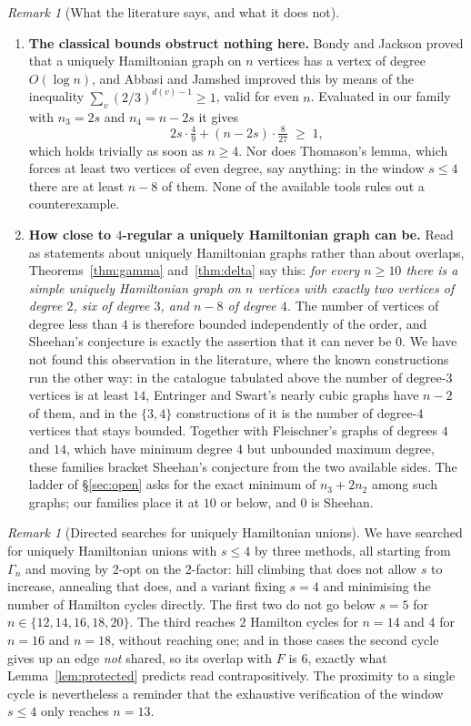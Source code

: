 \documentclass[11pt,a4paper]{article}
\theoremstyle{definition}
\theoremstyle{remark}
\newtheorem{remark}[theorem]{Remark}
\begin{document}
\begin{remark}[What the literature says, and what it does not]
\begin{enumerate}[label=(\arabic*)]
\item \textbf{The classical bounds obstruct nothing here.} Bondy and Jackson \cite{bj98} proved that a uniquely Hamiltonian graph on $n$ vertices has a vertex of degree $O(\log n)$, and Abbasi and Jamshed \cite{aj06} improved this by means of the inequality $\sum_v(2/3)^{d(v)-1}\ge1$, valid for even $n$. Evaluated in our family with $n_3=2s$ and $n_4=n-2s$ it gives
\[
2s\cdot\tfrac49+(n-2s)\cdot\tfrac8{27}\;\ge\;1,
\]
which holds trivially as soon as $n\ge4$. Nor does Thomason's lemma, which forces at least two vertices of even degree, say anything: in the window $s\le4$ there are at least $n-8$ of them. None of the available tools rules out a counterexample.

\item \textbf{How close to $4$-regular a uniquely Hamiltonian graph can be.} Read as statements about uniquely Hamiltonian graphs rather than about overlaps, Theorems~\ref{thm:gamma} and~\ref{thm:delta} say this: \emph{for every $n\ge10$ there is a simple uniquely Hamiltonian graph on $n$ vertices with exactly two vertices of degree $2$, six of degree $3$, and $n-8$ of degree $4$.} The number of vertices of degree less than $4$ is therefore bounded independently of the order, and Sheehan's conjecture is exactly the assertion that it can never be $0$. We have not found this observation in the literature, where the known constructions run the other way: in the catalogue tabulated above the number of degree-$3$ vertices is at least $14$, Entringer and Swart's nearly cubic graphs have $n-2$ of them, and in the $\{3,4\}$ constructions of \cite{bdp24,gjlsz} it is the number of degree-$4$ vertices that stays bounded. Together with Fleischner's graphs of degrees $4$ and $14$, which have minimum degree $4$ but unbounded maximum degree, these families bracket Sheehan's conjecture from the two available sides. The ladder of \S\ref{sec:open} asks for the exact minimum of $n_3+2n_2$ among such graphs; our families place it at $10$ or below, and $0$ is Sheehan.
\end{enumerate}
\end{remark}

\begin{remark}[Directed searches for uniquely Hamiltonian unions]\label{rem:searchUH}
We have searched for uniquely Hamiltonian unions with $s\le4$ by three methods, all starting from $\Gamma_n$ and moving by 2-opt on the 2-factor: hill climbing that does not allow $s$ to increase, annealing that does, and a variant fixing $s=4$ and minimising the number of Hamilton cycles directly. The first two do not go below $s=5$ for $n\in\{12,14,16,18,20\}$. The third reaches $2$ Hamilton cycles for $n=14$ and $4$ for $n=16$ and $n=18$, without reaching one; and in those cases the second cycle gives up an edge \emph{not} shared, so its overlap with $F$ is $6$, exactly what Lemma~\ref{lem:protected} predicts read contrapositively. The proximity to a single cycle is nevertheless a reminder that the exhaustive verification of the window $s\le4$ only reaches $n=13$.
\end{remark}
\end{document}
